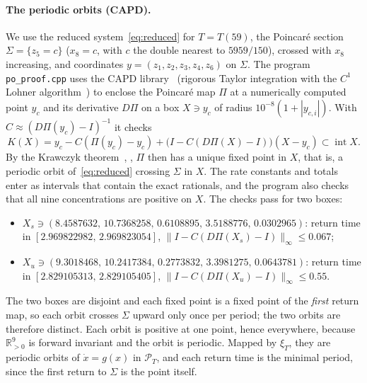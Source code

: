 \documentclass[11pt,a4paper]{report}
\begin{document}
\paragraph{The periodic orbits (CAPD).} We use the reduced system~\eqref{eq:reduced} for $T=T(59)$, the Poincaré section $\Sigma=\{z_5=c\}$ ($x_8=c$, with $c$ the double nearest to $5959/150$), crossed with $x_8$ increasing, and coordinates $y=(z_1,z_2,z_3,z_4,z_6)$ on $\Sigma$. The program \texttt{po\_proof.cpp} uses the CAPD library~\autocite{CAPD2021} (rigorous Taylor integration with the $C^1$ Lohner algorithm~\autocite{Zgliczynski2002}) to enclose the Poincaré map $\Pi$ at a numerically computed point $y_c$ and its derivative $D\Pi$ on a box $X\ni y_c$ of radius $10^{-8}(1+|y_{c,i}|)$. With $C\approx(D\Pi(y_c)-I)^{-1}$ it checks
\[
K(X)=y_c-C(\Pi(y_c)-y_c)+\bigl(I-C(D\Pi(X)-I)\bigr)(X-y_c)\subset\operatorname{int}X .
\]
By the Krawczyk theorem~\autocite{Krawczyk1969}, \autocite[§5.1]{Neumaier1990}, $\Pi$ then has a unique fixed point in $X$, that is, a periodic orbit of~\eqref{eq:reduced} crossing $\Sigma$ in $X$. The rate constants and totals enter as intervals that contain the exact rationals, and the program also checks that all nine concentrations are positive on $X$. The checks pass for two boxes:
\begin{itemize}
\item $X_s\ni(8.4587632,\,10.7368258,\,0.6108895,\,3.5188776,\,0.0302965)$: return time in $[2.969822982,\,2.969823054]$, $\|I-C(D\Pi(X_s)-I)\|_\infty\le0.067$;
\item $X_u\ni(9.3018468,\,10.2417384,\,0.2773832,\,3.3981275,\,0.0643781)$: return time in $[2.829105313,\,2.829105405]$, $\|I-C(D\Pi(X_u)-I)\|_\infty\le0.55$.
\end{itemize}
The two boxes are disjoint and each fixed point is a fixed point of the \emph{first} return map, so each orbit crosses $\Sigma$ upward only once per period; the two orbits are therefore distinct. Each orbit is positive at one point, hence everywhere, because $\mathbb R^9_{>0}$ is forward invariant and the orbit is periodic. Mapped by $\xi_T$, they are periodic orbits of $\dot x=g(x)$ in $\mathcal P_T$, and each return time is the minimal period, since the first return to $\Sigma$ is the point itself.
\end{document}
